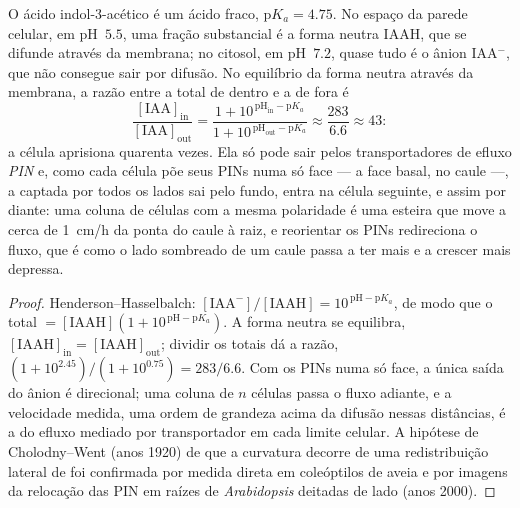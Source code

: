\begin{theorem}\label{thm:b3:plant-molecular-physiology:auxin}
O ácido indol-3-acético é um ácido fraco, $\mathrm{p}K_{a} = 4.75$. No
espaço da parede celular, em pH~$5.5$, uma fração substancial é a forma
neutra IAAH, que se difunde através da membrana; no citosol, em pH~$7.2$,
quase tudo é o ânion IAA$^{-}$, que não consegue sair por difusão. No
equilíbrio da forma neutra através da membrana, a razão entre a 
total de dentro e a de fora é
\[
\frac{[\text{IAA}]_{\text{in}}}{[\text{IAA}]_{\text{out}}}
= \frac{1 + 10^{\,\mathrm{pH}_{\text{in}} - \mathrm{p}K_{a}}}{1 + 10^{\,\mathrm{pH}_{\text{out}} - \mathrm{p}K_{a}}}
\approx \frac{283}{6.6} \approx 43 :
\]
a célula aprisiona  quarenta vezes. Ela só pode sair pelos
transportadores de efluxo \emph{PIN} e, como cada célula põe seus PINs
numa só face --- a face basal, no caule ---, a  captada por todos
os lados sai pelo fundo, entra na célula seguinte, e assim por diante:
uma coluna de células com a mesma polaridade é uma esteira que move
 a cerca de \qty{1}{cm/h} da ponta do caule à raiz, e reorientar os
PINs redireciona o fluxo, que é como o lado sombreado de um caule passa a
ter mais  e a crescer mais depressa.
\end{theorem}
\begin{proof}
Henderson--Hasselbalch: $[\text{IAA}^{-}]/[\text{IAAH}] = 10^{\,\mathrm{pH}
- \mathrm{p}K_{a}}$, de modo que o total $= [\text{IAAH}](1 + 10^{\,\mathrm{pH} -
\mathrm{p}K_{a}})$. A forma neutra se equilibra,
$[\text{IAAH}]_{\text{in}}
= [\text{IAAH}]_{\text{out}}$; dividir os
totais dá a razão, $(1 + 10^{2.45})/(1 + 10^{0.75}) = 283/6.6$. Com os
PINs numa só face, a única saída do ânion é direcional; uma coluna de $n$
células passa o fluxo adiante, e a velocidade medida, uma ordem de
grandeza acima da difusão nessas distâncias, é a do efluxo mediado por
transportador em cada limite celular. A hipótese de Cholodny--Went (anos
1920) de que a curvatura decorre de uma redistribuição lateral de 
foi confirmada por medida direta em coleóptilos de aveia e por imagens da
relocação das PIN em raízes de \emph{Arabidopsis} deitadas de lado (anos
2000).
\end{proof}

